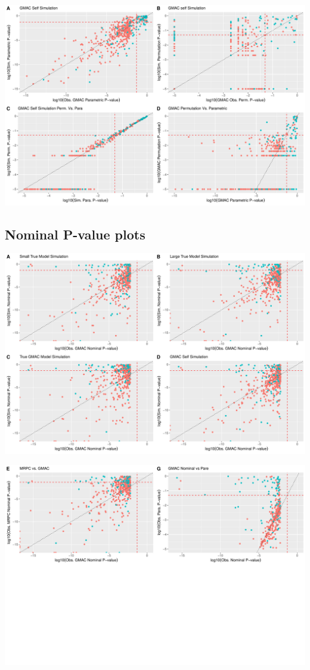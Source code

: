 \documentclass[
]{article}
\begin{document}
\includegraphics{GMACwriteup_files/figure-latex/unnamed-chunk-8-1.pdf}

\hypertarget{nominal-p-value-plots}{%
\subsection{Nominal P-value plots}\label{nominal-p-value-plots}}

\includegraphics{GMACwriteup_files/figure-latex/unnamed-chunk-9-1.pdf}

\includegraphics{GMACwriteup_files/figure-latex/unnamed-chunk-10-1.pdf}
\end{document}
